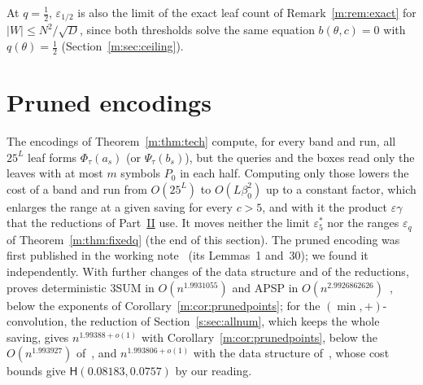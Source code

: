 \documentclass[11pt]{article}
\theoremstyle{definition}
\theoremstyle{remark}
\newcommand{\es}{\varepsilon^*_5}
\newcommand{\Hyp}{\mathsf{H}}
\newcommand{\ExpThreeSumShrTwentySix}{1.9931055}%
\newcommand{\MinConvShrTwentySix}{1.993927}%
\newcommand{\MinConvRBest}{1.99388}%
\newcommand{\MinConvShrLemmaThirtyOne}{1.993806}%
\newcommand{\HypShrEps}{0.08183}%
\newcommand{\HypShrGamma}{0.0757}%
\newcommand{\APSPdetShrTwentySix}{2.9926862626}%
\begin{document}
At $q=\frac12$, $\varepsilon_{1/2}$ is also the limit of the exact leaf count of Remark~\ref{m:rem:exact} for $|W|\le N^2/\sqrt D$, since both thresholds solve the same equation $b(\theta,c)=0$ with $q(\theta)=\frac12$ (Section~\ref{m:sec:ceiling}).
\section{Pruned encodings}\label{m:sec:pruned}

The encodings of Theorem~\ref{m:thm:tech} compute, for every band and run, all $25^L$ leaf forms $\Phi_\tau(a_s)$ (or $\Psi_\tau(b_s)$), but the queries and the boxes read only the leaves with at most $m$ symbols $P_0$ in each half. Computing only those lowers the cost of a band and run from $O(25^L)$ to $O(L\beta_0^2)$ up to a constant factor, which enlarges the range at a given saving for every $c>5$, and with it the product $\varepsilon\gamma$ that the reductions of Part~\hyperref[m:partII]{II} use. It moves neither the limit $\es$ nor the ranges $\varepsilon_q$ of Theorem~\ref{m:thm:fixedq} (the end of this section). The pruned encoding was first published in the working note~\cite{Shr26} (its Lemmas~1 and~30); we found it independently.
With further changes of the data structure and of the reductions,~\cite{Shr26} proves deterministic 3SUM in $O(n^{\ExpThreeSumShrTwentySix})$ and APSP in $O(n^{\APSPdetShrTwentySix})$~\cite[Theorem~64, Corollary~51]{Shr26}, below the exponents of Corollary~\ref{m:cor:prunedpoints}; for the $(\min,+)$-convolution, the reduction of Section~\ref{s:sec:allnum}, which keeps the whole saving, gives $n^{\MinConvRBest+o(1)}$ with Corollary~\ref{m:cor:prunedpoints}, below the $O(n^{\MinConvShrTwentySix})$ of~\cite[Corollary~59]{Shr26}, and $n^{\MinConvShrLemmaThirtyOne+o(1)}$ with the data structure of~\cite[Lemma~31]{Shr26}, whose cost bounds give $\Hyp(\HypShrEps,\HypShrGamma)$ by our reading.
\end{document}
